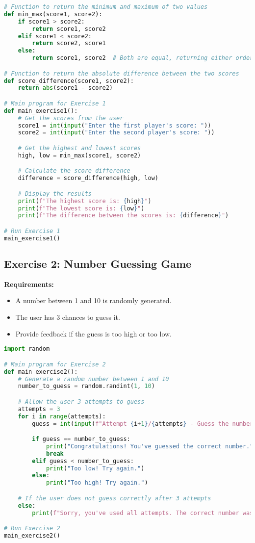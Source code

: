 \documentclass{article}
\begin{document}
\begin{lstlisting}[language=Python]
# Function to return the minimum and maximum of two values
def min_max(score1, score2):
    if score1 > score2:
        return score1, score2
    elif score1 < score2:
        return score2, score1
    else:
        return score1, score2  # Both are equal, returning either order doesn't matter

# Function to return the absolute difference between the two scores
def score_difference(score1, score2):
    return abs(score1 - score2)

# Main program for Exercise 1
def main_exercise1():
    # Get the scores from the user
    score1 = int(input("Enter the first player's score: "))
    score2 = int(input("Enter the second player's score: "))

    # Get the highest and lowest scores
    high, low = min_max(score1, score2)

    # Calculate the score difference
    difference = score_difference(high, low)

    # Display the results
    print(f"The highest score is: {high}")
    print(f"The lowest score is: {low}")
    print(f"The difference between the scores is: {difference}")

# Run Exercise 1
main_exercise1()
\end{lstlisting}

\subsection{Exercise 2: Number Guessing Game}

\textbf{Requirements:}
\begin{itemize}
    \item A number between 1 and 10 is randomly generated.
    \item The user has 3 chances to guess it.
    \item Provide feedback if the guess is too high or too low.
\end{itemize}

\begin{lstlisting}[language=Python]
import random

# Main program for Exercise 2
def main_exercise2():
    # Generate a random number between 1 and 10
    number_to_guess = random.randint(1, 10)

    # Allow the user 3 attempts to guess
    attempts = 3
    for i in range(attempts):
        guess = int(input(f"Attempt {i+1}/{attempts} - Guess the number (1-10): "))

        if guess == number_to_guess:
            print("Congratulations! You've guessed the correct number.")
            break
        elif guess < number_to_guess:
            print("Too low! Try again.")
        else:
            print("Too high! Try again.")

    # If the user does not guess correctly after 3 attempts
    else:
        print(f"Sorry, you've used all attempts. The correct number was {number_to_guess}.")

# Run Exercise 2
main_exercise2()
\end{lstlisting}
\end{document}
